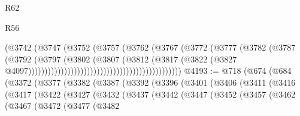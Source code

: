 \begin{lexlean}{R62}
\begin{lexlean}{R56}
\begin{coremodule}
{{{{{{{{{{{{{{{{{{{{{{{{{{{{{{{{{{{{{{{{{{{{{{{{{{{{{{{{{{{{{{{{{{{{{{{{{{{{{{{{{{{{{{{{{{{{{{{{{{{{{{{{{{{{{{{{{{{{{{{{{{{{{{{{{{{{{{{{{{{{{{{{{{{{{{{{{{{{{{{{{{{{{{{{{{{{{{{{{{{{{{{{{{{{{{{{{{{{{{{{{{{{{{{{{{{                                                              (@3742
                                                                (@3747
                                                                  (@3752
                                                                    (@3757
                                                                      (@3762
                                                                        (@3767
                                                                          (@3772
                                                                            (@3777
                                                                              (@3782
                                                                                (@3787
                                                                                  (@3792
                                                                                    (@3797
                                                                                      (@3802
                                                                                        (@3807
                                                                                          (@3812
                                                                                            (@3817
                                                                                              (@3822
                                                                                                (@3827
                                                                                                  @4097)))))))))))))))))))))))))))))))))))))))))))))))
@4193 := @718
    (@674
      (@684
        (@3372
          (@3377
            (@3382
              (@3387
                (@3392
                  (@3396
                    (@3401
                      (@3406
                        (@3411
                          (@3416
                            (@3417
                              (@3422
                                (@3427
                                  (@3432
                                    (@3437
                                      (@3442
                                        (@3447
                                          (@3452
                                            (@3457
                                              (@3462
                                                (@3467
                                                  (@3472
                                                    (@3477
                                                      (@3482
}}}}}}}}}}}}}}}}}}}}}}}}}}}}}}}}}}}}}}}}}}}}}}}}}}}}}}}}}}}}}}}}}}}}}}}}}}}}}}}}}}}}}}}}}}}}}}}}}}}}}}}}}}}}}}}}}}}}}}}}}}}}}}}}}}}}}}}}}}}}}}}}}}}}}}}}}}}}}}}}}}}}}}}}}}}}}}}}}}}}}}}}}}}}}}}}}}}}}}}}}}}}}}}}}}}
\end{coremodule}
\end{lexlean}
\end{lexlean}
